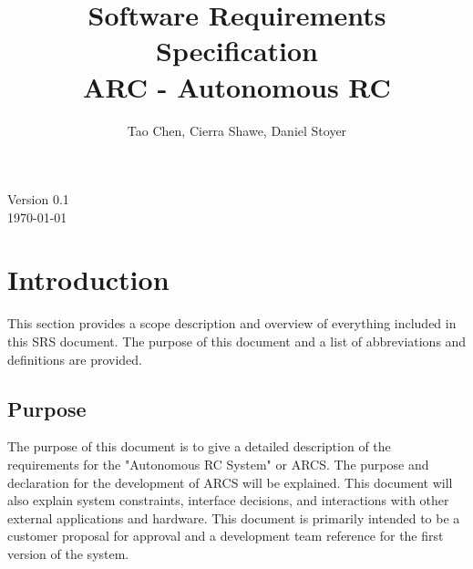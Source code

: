 \documentclass[compsoc,draftclsnofoot,onecolumn,10pt]{IEEEtran}
\date{}
\begin{document}
\begin{titlepage}
	\title{Software Requirements Specification\\
	ARC - Autonomous RC}
	\author{Tao Chen, Cierra Shawe, Daniel Stoyer}
	\maketitle
	\begin{center}
	Version 0.1\\
	\vspace{1.9cm}
	\today
	\end{center}

	\thispagestyle{empty} %
	
\end{titlepage}

\tableofcontents

\newpage

\section{Introduction} %
This section provides a scope description and overview of everything included 
in this SRS document. The purpose of this document and a list of 
abbreviations and definitions are provided.

\subsection{Purpose} %
The purpose of this document is to give a detailed description of the requirements 
for the "Autonomous RC System" or ARCS. The purpose and declaration for the 
development of ARCS will be explained. This document will also explain system 
constraints, interface decisions, and interactions with other external applications and 
hardware. This document is primarily intended to be a customer proposal for 
approval and a development team reference for the first version of the system.
\end{document}
